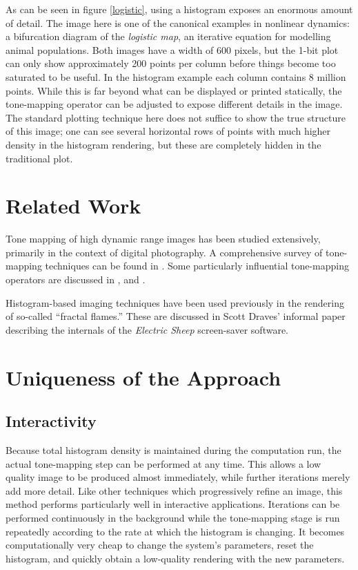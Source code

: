 \documentclass[letterpaper, 12pt]{article}
\begin{document}
As can be seen in figure \ref{logistic}, using a histogram exposes an enormous amount of
detail.  The image here is one of the canonical examples in nonlinear dynamics: a bifurcation
diagram of the \emph{logistic map}, an iterative equation for modelling animal populations.
Both images have a width of 600 pixels, but the 1-bit plot can only show approximately 200
points per column before things become too saturated to be useful.  In the histogram example
each column contains 8 million points.  While this is far beyond what can be displayed or
printed statically, the tone-mapping operator can be adjusted to expose different details
in the image.  The standard plotting technique here does not suffice to show the true structure
of this image;  one can see several horizontal rows of points with much higher density in
the histogram rendering, but these are completely hidden in the traditional plot.

\section{Related Work}
Tone mapping of high dynamic range images has been studied extensively, primarily in the
context of digital photography.  A comprehensive survey of tone-mapping techniques can be
found in \cite{kd}.  Some particularly influential tone-mapping operators are discussed
in \cite{jt}, \cite{jtjhbg} and \cite{gw}.

Histogram-based imaging techniques have been used previously in the rendering of so-called
``fractal flames.''  These are discussed in Scott Draves' informal paper describing the
internals of the \emph{Electric Sheep} screen-saver software\cite{sd}.

\section{Uniqueness of the Approach}

\subsection{Interactivity}
Because total histogram density is maintained during the computation run, the actual
tone-mapping step can be performed at any time.  This allows a low quality image to
be produced almost immediately, while further iterations merely add more detail.  Like
other techniques which progressively refine an image, this method performs particularly
well in interactive applications.  Iterations can be performed continuously in the
background while the tone-mapping stage is run repeatedly according to the rate at which
the histogram is changing.  It becomes computationally very cheap to change the system's
parameters, reset the histogram, and quickly obtain a low-quality rendering with the
new parameters.
\end{document}
